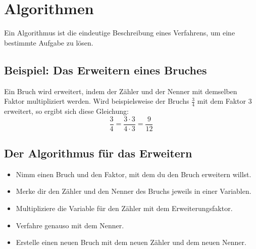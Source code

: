 \section{Algorithmen}
\label{sec:Algorithmus}

Ein Algorithmus ist die eindeutige Beschreibung eines Verfahrens, um eine bestimmte Aufgabe zu lösen.

\subsection*{Beispiel: Das Erweitern eines Bruches}

Ein Bruch wird erweitert, indem der Zähler und der Nenner mit demselben Faktor multipliziert werden. Wird beispielsweise der Bruchs $\frac{3}{4}$ mit dem Faktor $3$ erweitert, so ergibt sich diese Gleichung:
\[
\frac{3}{4} = \frac{3 \cdot 3}{4 \cdot 3} = \frac{9}{12}
\]

\subsection*{Der Algorithmus für das Erweitern}

\begin{itemize}
	\item Nimm einen Bruch und den Faktor, mit dem du den Bruch erweitern willst.
	\item Merke dir den Zähler und den Nenner des Bruchs jeweils in einer Variablen.
	\item Multipliziere die Variable für den Zähler mit dem Erweiterungsfaktor.
	\item Verfahre genauso mit dem Nenner.
	\item Erstelle einen neuen Bruch mit dem neuen Zähler und dem neuen Nenner.
\end{itemize}